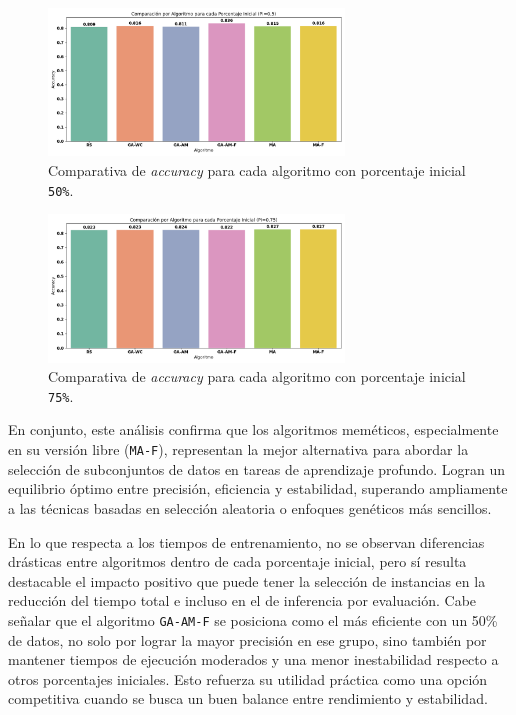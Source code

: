 \begin{figure}[htp]
    \centering
    \includegraphics[width=0.7\textwidth]{imagenes/evaluaciones/final/barplot-por-pi/pi-50.png}
    \caption{Comparativa de \textit{accuracy} para cada algoritmo con porcentaje inicial \texttt{50\%}.}
    \label{fig:barplot-por-pi-50}
\end{figure}

\begin{figure}[htp]
    \centering
    \includegraphics[width=0.7\textwidth]{imagenes/evaluaciones/final/barplot-por-pi/pi-75.png}
    \caption{Comparativa de \textit{accuracy} para cada algoritmo con porcentaje inicial \texttt{75\%}.}
    \label{fig:barplot-por-pi-75}
\end{figure}

En conjunto, este análisis confirma que los algoritmos meméticos, especialmente en su versión libre (\texttt{MA-F}),
representan la mejor alternativa para abordar la selección de subconjuntos de datos en tareas de aprendizaje profundo.
Logran un equilibrio óptimo entre precisión, eficiencia y estabilidad, superando ampliamente a las técnicas basadas en selección aleatoria o enfoques genéticos más sencillos.

En lo que respecta a los tiempos de entrenamiento, no se observan diferencias drásticas entre algoritmos dentro de cada porcentaje inicial, 
pero sí resulta destacable el impacto positivo que puede tener la selección de instancias en la reducción del tiempo total e incluso en el de inferencia por evaluación.
Cabe señalar que el algoritmo \texttt{GA-AM-F} se posiciona como el más eficiente con un 50\% de datos, no solo por lograr la mayor precisión en ese grupo, 
sino también por mantener tiempos de ejecución moderados y una menor inestabilidad respecto a otros porcentajes iniciales.
Esto refuerza su utilidad práctica como una opción competitiva cuando se busca un buen balance entre rendimiento y estabilidad.


